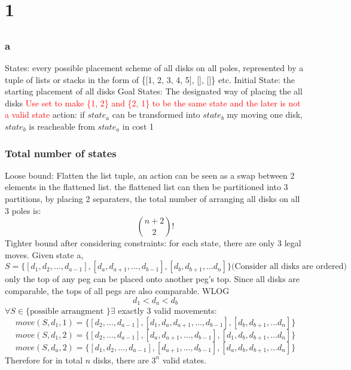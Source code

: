 \documentclass{article}
\begin{document}
\title{}
\author{Wang Xiyu}
\date{}
\maketitle

\section{1}
\subsection{}
\subsubsection*{a}
States: every possible placement scheme of all disks on all poles, represented by a tuple of lists or stacks in the form of \{[1, 2, 3, 4, 5], [], []\} etc.\newline
Initial State: the starting placement of all disks\newline
Goal States: The designated way of placing the all disks\newline
\textcolor{red} {Use set to make \{1, 2\} and \{2, 1\} to be the same state and the later is not a valid state}\newline
action: if $state_a$ can be transformed into $state_b$ my moving one disk, $state_b$ is reacheable from $state_a$ in cost 1 
\subsubsection*{Total number of states}
Loose bound:\newline
Flatten the list tuple, an action can be seen as a swap between 2 elements in the flattened list. the flattened list can then be partitioned into 3 partitions, by placing 2 separaters, the total number of arranging all disks on all 3 poles is:
\[\binom{n + 2}{2}!\]
Tighter bound after considering constraints: \newline
for each state, there are only 3 legal moves. Given state a, 
\[S = \{[d_1, d_2,\dots, d_{a-1}], [d_a, d_{a+1},\dots, d_{b-1}], [d_b, d_{b+1}, \dots d_n]\} \text{(Consider all disks are ordered)}\]
only the top of any peg can be placed onto another peg's top. Since all disks are comparable, the tops of all pegs are also comparable. WLOG
\[d_1 < d_a < d_b\]
$\forall S \in \{\text{possible arrangment }\} \exists $ exactly 3 valid movements: 
\[move(S, d_1, 1) = \{[d_2,\dots, d_{a-1}], [d_1, d_a, d_{a+1},\dots, d_{b-1}], [d_b, d_{b+1}, \dots d_n]\}\]
\[move(S, d_1, 2) = \{[d_2,\dots, d_{a-1}], [d_a, d_{a+1},\dots, d_{b-1}], [d_1, d_b, d_{b+1}, \dots d_n]\}\]
\[move(S, d_a, 2) = \{[d_1, d_2,\dots, d_{a-1}], [d_{a+1},\dots, d_{b-1}], [d_a, d_b, d_{b+1}, \dots d_n]\}\]
Therefore for in total $n$ disks, there are $3^n$ valid states. 
\end{document}
